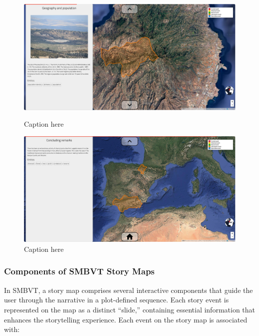 \begin{figure}[h!tb]
\begin{multicols}{2}
    \includegraphics[width=\linewidth]{img/charcoal3.png}
    \caption{Caption here}\label{fig:charcoal3}\par
    \includegraphics[width=\linewidth]{img/charcoal4.png}
    \caption{Caption here}\label{fig:charcoal4}\par
\end{multicols}
\end{figure}

\subsubsection{Components of SMBVT Story Maps}
In SMBVT, a story map comprises several interactive components that guide the user through the narrative in a plot-defined sequence. Each story event is represented on the map as a distinct “slide,” containing essential information that enhances the storytelling experience. Each event on the story map is associated with:

